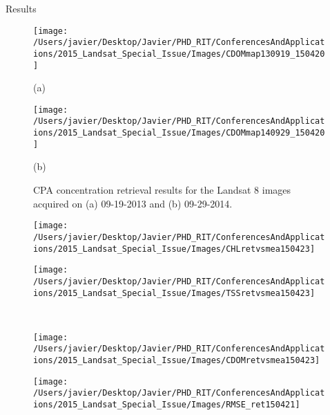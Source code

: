 \documentclass{beamer}
\begin{document}
\begin{frame}{}
\begin{columns}[t]
\begin{column}{.32\linewidth}
\begin{block}{Results}
\begin{figure}[htbp!]
  \begin{minipage}[c]{0.46\linewidth}
      \centering
      \texttt{[image: /Users/javier/Desktop/Javier/PHD\_RIT/ConferencesAndApplications/2015\_Landsat\_Special\_Issue/Images/CDOMmap130919\_150420]}\\
      \centerline{\small (a)}  
  \end{minipage}
  \hspace{1cm}
  \begin{minipage}[c]{0.46\linewidth}
      \centering
      \texttt{[image: /Users/javier/Desktop/Javier/PHD\_RIT/ConferencesAndApplications/2015\_Landsat\_Special\_Issue/Images/CDOMmap140929\_150420]}\\
      \centerline{\small (b)}
  \end{minipage}
  \caption{CPA concentration retrieval results for the Landsat 8 images acquired on (a) 09-19-2013 and (b) 09-29-2014.} 
\end{figure}


\begin{figure}[htb]
  \begin{minipage}[c]{0.47\linewidth}
      \centering
      \texttt{[image: /Users/javier/Desktop/Javier/PHD\_RIT/ConferencesAndApplications/2015\_Landsat\_Special\_Issue/Images/CHLretvsmea150423]} 
  \end{minipage}
  \hspace{0.5cm}
  \begin{minipage}[d]{0.47\linewidth}
      \centering
      \texttt{[image: /Users/javier/Desktop/Javier/PHD\_RIT/ConferencesAndApplications/2015\_Landsat\_Special\_Issue/Images/TSSretvsmea150423]}
  \end{minipage}\\
  \begin{minipage}[c]{0.47\linewidth}
      \centering
      \texttt{[image: /Users/javier/Desktop/Javier/PHD\_RIT/ConferencesAndApplications/2015\_Landsat\_Special\_Issue/Images/CDOMretvsmea150423]}  
  \end{minipage}
  \hspace{0.5cm}
  \begin{minipage}[c]{0.47\linewidth}
      \centering
      \texttt{[image: /Users/javier/Desktop/Javier/PHD\_RIT/ConferencesAndApplications/2015\_Landsat\_Special\_Issue/Images/RMSE\_ret150421]}
  \end{minipage}


\end{figure}
\end{block}
\end{column}
\end{columns}
\end{frame}
\end{document}
